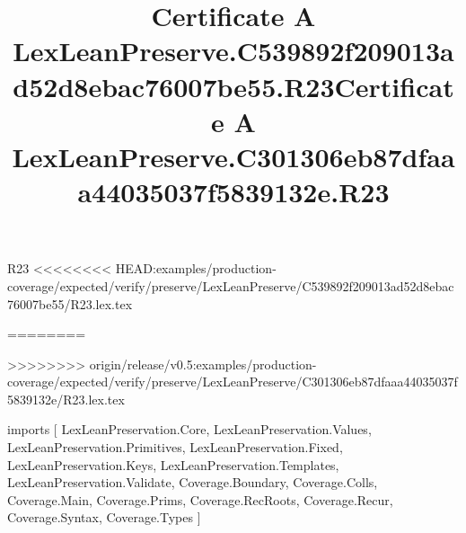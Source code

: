\begin{lexlean}{R23}
<<<<<<<< HEAD:examples/production-coverage/expected/verify/preserve/LexLeanPreserve/C539892f209013ad52d8ebac76007be55/R23.lex.tex
\title{Certificate A LexLeanPreserve.C539892f209013ad52d8ebac76007be55.R23}
========
\title{Certificate A LexLeanPreserve.C301306eb87dfaaa44035037f5839132e.R23}
>>>>>>>> origin/release/v0.5:examples/production-coverage/expected/verify/preserve/LexLeanPreserve/C301306eb87dfaaa44035037f5839132e/R23.lex.tex
\begin{coremodule}
imports [
  LexLeanPreservation.Core,
  LexLeanPreservation.Values,
  LexLeanPreservation.Primitives,
  LexLeanPreservation.Fixed,
  LexLeanPreservation.Keys,
  LexLeanPreservation.Templates,
  LexLeanPreservation.Validate,
  Coverage.Boundary,
  Coverage.Colls,
  Coverage.Main,
  Coverage.Prims,
  Coverage.RecRoots,
  Coverage.Recur,
  Coverage.Syntax,
  Coverage.Types
]


\end{coremodule}
\end{lexlean}
